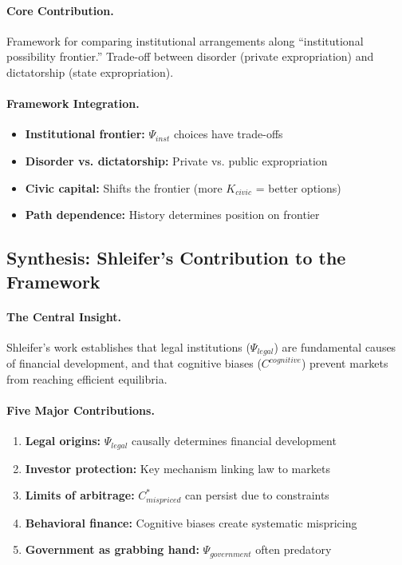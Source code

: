 \paragraph{Core Contribution.}
Framework for comparing institutional arrangements along ``institutional
possibility frontier.'' Trade-off between disorder (private expropriation)
and dictatorship (state expropriation).

\paragraph{Framework Integration.}
\begin{itemize}
  \item \textbf{Institutional frontier:} $\Psi_{inst}$ choices have trade-offs
  \item \textbf{Disorder vs. dictatorship:} Private vs. public expropriation
  \item \textbf{Civic capital:} Shifts the frontier (more $K_{civic}$ = better options)
  \item \textbf{Path dependence:} History determines position on frontier
\end{itemize}

\subsection{Synthesis: Shleifer's Contribution to the Framework}

\paragraph{The Central Insight.}
Shleifer's work establishes that legal institutions ($\Psi_{legal}$) are
fundamental causes of financial development, and that cognitive biases
($C^{cognitive}$) prevent markets from reaching efficient equilibria.

\paragraph{Five Major Contributions.}

\begin{enumerate}
  \item \textbf{Legal origins:} $\Psi_{legal}$ causally determines financial development
  \item \textbf{Investor protection:} Key mechanism linking law to markets
  \item \textbf{Limits of arbitrage:} $C^*_{mispriced}$ can persist due to constraints
  \item \textbf{Behavioral finance:} Cognitive biases create systematic mispricing
  \item \textbf{Government as grabbing hand:} $\Psi_{government}$ often predatory
\end{enumerate}

